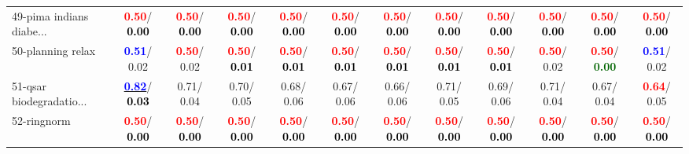 \begin{table}[h]
\begin{center}
{\begin{tabular}{lc|c|c|c|c|c|c|c|c|c|c}
49-pima indians diabe... & \textcolor{red}{\textbf{  0.50}}/\textcolor{black}{\textbf{  0.00}} & \textcolor{red}{\textbf{  0.50}}/\textcolor{black}{\textbf{  0.00}} & \textcolor{red}{\textbf{  0.50}}/\textcolor{black}{\textbf{  0.00}} & \textcolor{red}{\textbf{  0.50}}/\textcolor{black}{\textbf{  0.00}} & \textcolor{red}{\textbf{  0.50}}/\textcolor{black}{\textbf{  0.00}} & \textcolor{red}{\textbf{  0.50}}/\textcolor{black}{\textbf{  0.00}} & \textcolor{red}{\textbf{  0.50}}/\textcolor{black}{\textbf{  0.00}} & \textcolor{red}{\textbf{  0.50}}/\textcolor{black}{\textbf{  0.00}} & \textcolor{red}{\textbf{  0.50}}/\textcolor{black}{\textbf{  0.00}} & \textcolor{red}{\textbf{  0.50}}/\textcolor{black}{\textbf{  0.00}} & \textcolor{red}{\textbf{  0.50}}/\textcolor{black}{\textbf{  0.00}} \\
50-planning relax & \textcolor{blue}{\textbf{  0.51}}/  0.02 & \textcolor{red}{\textbf{  0.50}}/  0.02 & \textcolor{red}{\textbf{  0.50}}/\textcolor{black}{\textbf{  0.01}} & \textcolor{red}{\textbf{  0.50}}/\textcolor{black}{\textbf{  0.01}} & \textcolor{red}{\textbf{  0.50}}/\textcolor{black}{\textbf{  0.01}} & \textcolor{red}{\textbf{  0.50}}/\textcolor{black}{\textbf{  0.01}} & \textcolor{red}{\textbf{  0.50}}/\textcolor{black}{\textbf{  0.01}} & \textcolor{red}{\textbf{  0.50}}/\textcolor{black}{\textbf{  0.01}} & \textcolor{red}{\textbf{  0.50}}/  0.02 & \textcolor{red}{\textbf{  0.50}}/\textcolor{darkgreen}{\textbf{  0.00}} & \textcolor{blue}{\textbf{  0.51}}/  0.02 \\
51-qsar biodegradatio... & \underline{\textcolor{blue}{\textbf{  0.82}}}/\textcolor{black}{\textbf{  0.03}} &   0.71/  0.04 &   0.70/  0.05 &   0.68/  0.06 &   0.67/  0.06 &   0.66/  0.06 &   0.71/  0.05 &   0.69/  0.06 &   0.71/  0.04 &   0.67/  0.04 & \textcolor{red}{\textbf{  0.64}}/  0.05 \\
52-ringnorm & \textcolor{red}{\textbf{  0.50}}/\textcolor{black}{\textbf{  0.00}} & \textcolor{red}{\textbf{  0.50}}/\textcolor{black}{\textbf{  0.00}} & \textcolor{red}{\textbf{  0.50}}/\textcolor{black}{\textbf{  0.00}} & \textcolor{red}{\textbf{  0.50}}/\textcolor{black}{\textbf{  0.00}} & \textcolor{red}{\textbf{  0.50}}/\textcolor{black}{\textbf{  0.00}} & \textcolor{red}{\textbf{  0.50}}/\textcolor{black}{\textbf{  0.00}} & \textcolor{red}{\textbf{  0.50}}/\textcolor{black}{\textbf{  0.00}} & \textcolor{red}{\textbf{  0.50}}/\textcolor{black}{\textbf{  0.00}} & \textcolor{red}{\textbf{  0.50}}/\textcolor{black}{\textbf{  0.00}} & \textcolor{red}{\textbf{  0.50}}/\textcolor{black}{\textbf{  0.00}} & \textcolor{red}{\textbf{  0.50}}/\textcolor{black}{\textbf{  0.00}} \\

\end{tabular}}
\end{center}
\end{table}
